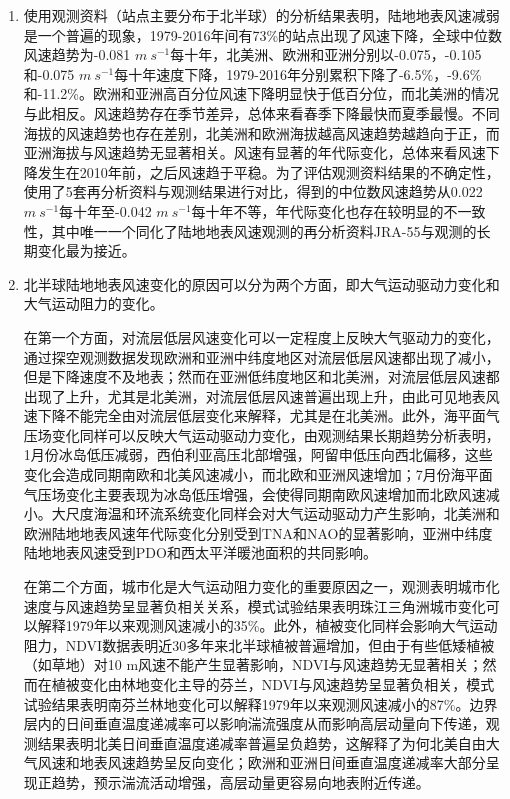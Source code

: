 \begin{enumerate}

\item 使用观测资料（站点主要分布于北半球）的分析结果表明，陆地地表风速减弱是一个普遍的现象，1979-2016年间有73\%的站点出现了风速下降，全球中位数风速趋势为-0.081 $m ~ s^{-1}$每十年，北美洲、欧洲和亚洲分别以-0.075，-0.105和-0.075 $m ~ s^{-1}$每十年速度下降，1979-2016年分别累积下降了-6.5\%，-9.6\%和-11.2\%。欧洲和亚洲高百分位风速下降明显快于低百分位，而北美洲的情况与此相反。风速趋势存在季节差异，总体来看春季下降最快而夏季最慢。不同海拔的风速趋势也存在差别，北美洲和欧洲海拔越高风速趋势越趋向于正，而亚洲海拔与风速趋势无显著相关。风速有显著的年代际变化，总体来看风速下降发生在2010年前，之后风速趋于平稳。为了评估观测资料结果的不确定性，使用了5套再分析资料与观测结果进行对比，得到的中位数风速趋势从0.022 $m ~ s^{-1}$每十年至-0.042 $m ~ s^{-1}$每十年不等，年代际变化也存在较明显的不一致性，其中唯一一个同化了陆地地表风速观测的再分析资料JRA-55与观测的长期变化最为接近。

\item 北半球陆地地表风速变化的原因可以分为两个方面，即大气运动驱动力变化和大气运动阻力的变化。

在第一个方面，对流层低层风速变化可以一定程度上反映大气驱动力的变化，通过探空观测数据发现欧洲和亚洲中纬度地区对流层低层风速都出现了减小，但是下降速度不及地表；然而在亚洲低纬度地区和北美洲，对流层低层风速都出现了上升，尤其是北美洲，对流层低层风速普遍出现上升，由此可见地表风速下降不能完全由对流层低层变化来解释，尤其是在北美洲。此外，海平面气压场变化同样可以反映大气运动驱动力变化，由观测结果长期趋势分析表明，1月份冰岛低压减弱，西伯利亚高压北部增强，阿留申低压向西北偏移，这些变化会造成同期南欧和北美风速减小，而北欧和亚洲风速增加；7月份海平面气压场变化主要表现为冰岛低压增强，会使得同期南欧风速增加而北欧风速减小。大尺度海温和环流系统变化同样会对大气运动驱动力产生影响，北美洲和欧洲陆地地表风速年代际变化分别受到TNA和NAO的显著影响，亚洲中纬度陆地地表风速受到PDO和西太平洋暖池面积的共同影响。

在第二个方面，城市化是大气运动阻力变化的重要原因之一，观测表明城市化速度与风速趋势呈显著负相关关系，模式试验结果表明珠江三角洲城市变化可以解释1979年以来观测风速减小的35\%。此外，植被变化同样会影响大气运动阻力，NDVI数据表明近30多年来北半球植被普遍增加，但由于有些低矮植被（如草地）对10 m风速不能产生显著影响，NDVI与风速趋势无显著相关；然而在植被变化由林地变化主导的芬兰，NDVI与风速趋势呈显著负相关，模式试验结果表明南芬兰林地变化可以解释1979年以来观测风速减小的87\%。边界层内的日间垂直温度递减率可以影响湍流强度从而影响高层动量向下传递，观测结果表明北美日间垂直温度递减率普遍呈负趋势，这解释了为何北美自由大气风速和地表风速趋势呈反向变化；欧洲和亚洲日间垂直温度递减率大部分呈现正趋势，预示湍流活动增强，高层动量更容易向地表附近传递。


\end{enumerate}
